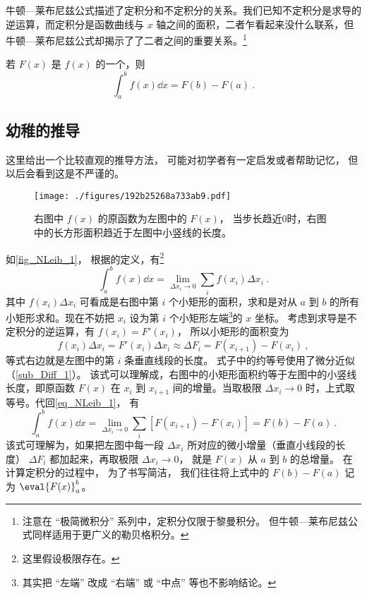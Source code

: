 

牛顿—莱布尼兹公式描述了定积分和不定积分的关系。我们已知不定积分是求导的逆运算，而定积分是函数曲线与 $x$ 轴之间的面积，二者乍看起来没什么联系，但牛顿—莱布尼兹公式却揭示了了二者之间的重要关系。\footnote{注意在 “极简微积分” 系列中，定积分仅限于黎曼积分。 但牛顿—莱布尼兹公式同样适用于更广义的勒贝格积分。}

若 $F(x)$ 是 $f(x)$ 的一个，则
\begin{equation}\label{eq_NLeib_1}
\int_a^b f(x) \dd{x}  = F(b) - F(a)~.
\end{equation}

\subsection{幼稚的推导}
这里给出一个比较直观的推导方法， 可能对初学者有一定启发或者帮助记忆， 但以后会看到这是不严谨的。
\begin{figure}[ht]
\centering
\texttt{[image: ./figures/192b25268a733ab9.pdf]}
\caption{右图中 $f(x)$ 的原函数为左图中的 $F(x)$， 当步长趋近0时，右图中的长方形面积趋近于左图中小竖线的长度。}\label{fig_NLeib_1}
\end{figure}

如\autoref{fig_NLeib_1}， 根据的定义，有\footnote{这里假设极限存在。}
\begin{equation}
\int_a^b f(x) \dd{x}= \lim_{\Delta x_i\to 0}\sum_i f(x_i)\Delta x_i~.
\end{equation}
其中 $f(x_i)\Delta x_i$ 可看成是右图中第 $i$ 个小矩形的面积，求和是对从 $a$ 到 $b$ 的所有小矩形求和。现在不妨把 $x_i$ 设为第 $i$ 个小矩形左端\footnote{其实把 “左端” 改成 “右端” 或 “中点” 等也不影响结论。}的 $x$ 坐标。 考虑到求导是不定积分的逆运算，有 $f(x_i)=F'(x_i)$， 所以小矩形的面积变为
\begin{equation}
f(x_i)\Delta x_i = F'(x_i)\Delta x_i \approx \Delta F_i = F(x_{i+1})-F(x_i)~,
\end{equation}
等式右边就是左图中的第 $i$ 条垂直线段的长度。 式子中的约等号使用了微分近似（\autoref{sub_Diff_1}）。 该式可以理解成，右图中的小矩形面积约等于左图中的小竖线长度，即原函数 $F(x)$ 在 $x_i$ 到 $x_{i+1}$ 间的增量。当取极限 $\Delta x_i \to 0$ 时，上式取等号。代回\autoref{eq_NLeib_1}， 有
\begin{equation}
\int_a^b f(x) \dd{x}= \lim_{\Delta x_i\to 0}\sum_i [F(x_{i+1})-F(x_i)] = F(b)-F(a)~.
\end{equation}
该式可理解为，如果把左图中每一段 $\Delta x_i$ 所对应的微小增量（垂直小线段的长度） $\Delta F_i$ 都加起来，再取极限 $\Delta x_i \to 0$， 就是 $F(x)$ 从 $a$ 到 $b$ 的总增量。 在计算定积分的过程中， 为了书写简洁， 我们往往将上式中的 $F(b) - F(a)$ 记为 $\eval{F(x)}_a^b$。

